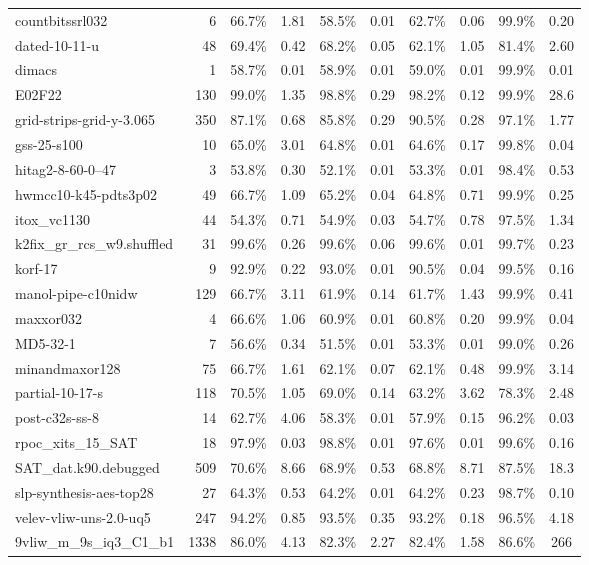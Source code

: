 \documentclass{llncs}
\begin{document}
\begin{table}
\begin{center}
\begin{tabular}{|l|r|c|c|c|c|c|c|c|c|}
countbitssrl032          &  6   &  66.7\% & 1.81 &  58.5\% & 0.01 & 62.7\% & 0.06 & 99.9\% &  0.20 \\
dated-10-11-u            &  48  &  69.4\% & 0.42 &  68.2\% & 0.05 & 62.1\% & 1.05 & 81.4\% &  2.60 \\
dimacs                   &  1   &  58.7\% & 0.01 &  58.9\% & 0.01 & 59.0\% & 0.01 & 99.9\% &  0.01 \\
E02F22                   &  130 &  99.0\% & 1.35 &  98.8\% & 0.29 & 98.2\% & 0.12 & 99.9\% &  28.6 \\
grid-strips-grid-y-3.065 & 350  &  87.1\% & 0.68 &  85.8\% & 0.29 & 90.5\% & 0.28 & 97.1\% &  1.77 \\
gss-25-s100              &  10  &  65.0\% & 3.01 &  64.8\% & 0.01 & 64.6\% & 0.17 & 99.8\% &  0.04 \\
hitag2-8-60-0--47        &  3   &  53.8\% & 0.30 &  52.1\% & 0.01 & 53.3\% & 0.01 & 98.4\% &  0.53 \\
hwmcc10-k45-pdts3p02     & 49   &  66.7\% & 1.09 &  65.2\% & 0.04 & 64.8\% & 0.71 & 99.9\% &  0.25 \\
itox\_vc1130             & 44   &  54.3\% & 0.71 &  54.9\% & 0.03 & 54.7\% & 0.78 & 97.5\% &  1.34 \\
k2fix\_gr\_rcs\_w9.shuffled & 31   &  99.6\% & 0.26 &  99.6\% & 0.06 & 99.6\% & 0.01 & 99.7\% &  0.23 \\
korf-17                  & 9    &  92.9\% & 0.22 &  93.0\% & 0.01 & 90.5\% & 0.04 & 99.5\% &  0.16 \\
manol-pipe-c10nidw       & 129  &  66.7\% & 3.11 &  61.9\% & 0.14 & 61.7\% & 1.43 & 99.9\% &  0.41 \\
maxxor032                & 4    &  66.6\% & 1.06 &  60.9\% & 0.01 & 60.8\% & 0.20 & 99.9\% &  0.04 \\
MD5-32-1                 & 7    &  56.6\% & 0.34 &  51.5\% & 0.01 & 53.3\% & 0.01 & 99.0\% &  0.26 \\
minandmaxor128           & 75   &  66.7\% & 1.61 &  62.1\% & 0.07 & 62.1\% & 0.48 & 99.9\% &  3.14 \\
partial-10-17-s          & 118  &  70.5\% & 1.05 &  69.0\% & 0.14 & 63.2\% & 3.62 & 78.3\% &  2.48 \\
post-c32s-ss-8           & 14   &  62.7\% & 4.06 &  58.3\% & 0.01 & 57.9\% & 0.15 & 96.2\% &  0.03 \\
rpoc\_xits\_15\_SAT      & 18   &  97.9\% & 0.03 &  98.8\% & 0.01 & 97.6\% & 0.01 & 99.6\% &  0.16 \\
SAT\_dat.k90.debugged    & 509  &  70.6\% & 8.66 &  68.9\% & 0.53 & 68.8\% & 8.71 & 87.5\% &  18.3 \\
slp-synthesis-aes-top28  & 27   &  64.3\% & 0.53 &  64.2\% & 0.01 & 64.2\% & 0.23 & 98.7\% &  0.10 \\
velev-vliw-uns-2.0-uq5   & 247  &  94.2\% & 0.85 &  93.5\% & 0.35 & 93.2\% & 0.18 & 96.5\% &  4.18 \\
9vliw\_m\_9s\_iq3\_C1\_b1  & 1338 &  86.0\% & 4.13 &  82.3\% & 2.27 & 82.4\% & 1.58 & 86.6\% &  266  \\


\end{tabular}
\end{center}
\end{table}
\end{document}
